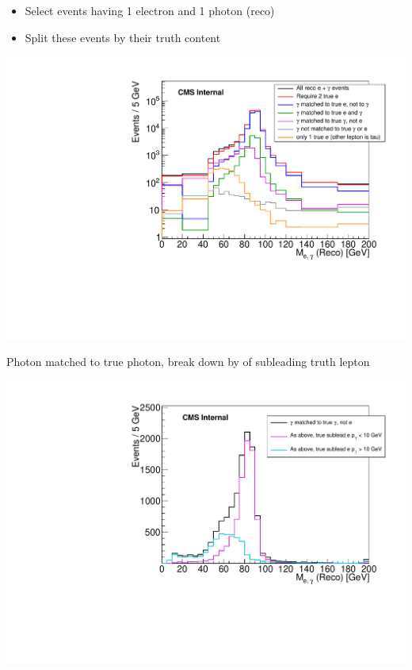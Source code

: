 \documentclass{beamer}
\begin{document}
 {

    \begin{itemize}
        \item Select events having 1 electron and 1 photon (reco)
        \item Split these events by their truth content
    \end{itemize}

    \bc

        \vspace{5mm}

        \includegraphics[width=\textwidth]{Plots/DYJetsToLL_1el1ph_truthComp.pdf}


        \scriptsize 

        Photon matched to true photon, break down by \pt of subleading truth lepton

        \includegraphics[width=\textwidth]{Plots/DYJetsToLL_1el1ph_truthCompRealPhotons.pdf}

    \ec

}
\end{document}
